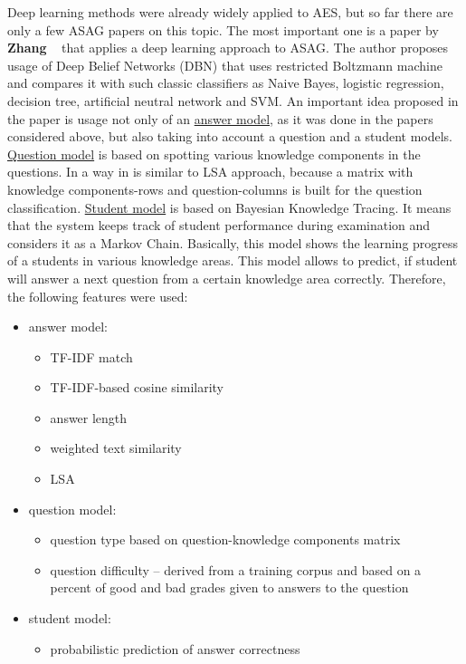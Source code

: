 Deep learning methods were already widely applied to AES, but so far there are only a few ASAG papers on this topic. The most important one is a paper by \textbf{Zhang} ~\cite{Zhang} that applies a deep learning approach to ASAG. The author proposes usage of Deep Belief Networks (DBN) that uses restricted Boltzmann machine and compares it with such classic classifiers as Naive Bayes, logistic regression, decision tree, artificial neutral network and SVM. An important idea proposed in the paper is usage not only of an \underline{answer model}, as it was done in the papers considered above, but also taking into account a question and a student models. \underline{Question model} is based on spotting various knowledge components in the questions. In a way in is similar to LSA approach, because a matrix with knowledge components-rows and question-columns is built for the question classification. \underline{Student model} is based on Bayesian Knowledge Tracing. It means that the system keeps track of student performance during examination and considers it as a Markov Chain. Basically, this model shows the learning progress of a students in various knowledge areas. This model allows to predict, if student will answer a next question from a certain knowledge area correctly. Therefore, the following features were used:
\begin{itemize}
\item answer model:
\begin{itemize}
\item TF-IDF match
\item TF-IDF-based cosine similarity
\item answer length
\item weighted text similarity
\item LSA
\end{itemize}
\item question model:
\begin{itemize}
\item question type based on question-knowledge components matrix
\item question difficulty -- derived from a training corpus and based on a percent of good and bad grades given to answers to the question
\end{itemize}
\item student model:
\begin{itemize}
\item probabilistic prediction of answer correctness
\end{itemize}
\end{itemize}


